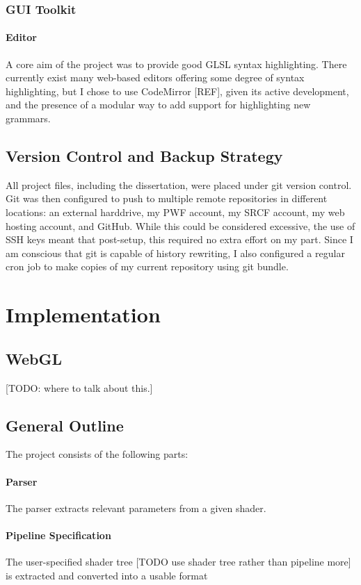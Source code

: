 \documentclass[12pt,twoside,notitlepage]{report}
\begin{document}
\subsection{GUI Toolkit}
\subsubsection{Editor}
A core aim of the project was to provide good GLSL syntax highlighting. There currently exist many web-based editors offering some degree of syntax highlighting, but I chose to use CodeMirror [REF], given its active development, and the presence of a modular way to add support for highlighting new grammars. 

\section{Version Control and Backup Strategy}
All project files, including the dissertation, were placed under git version control. Git was then configured to push to multiple remote repositories in different locations: an external harddrive, my PWF account, my SRCF account, my web hosting account, and GitHub. While this could be considered excessive, the use of SSH keys meant that post-setup, this required no extra effort on my part. Since I am conscious that git is capable of history rewriting, I also configured a regular cron job to make copies of my current repository using git bundle.

\cleardoublepage
\chapter{Implementation}

\section{WebGL}
[TODO: where to talk about this.]

\section{General Outline}
The project consists of the following parts:
\subsubsection{Parser}
The parser extracts relevant parameters from a given shader.
\subsubsection{Pipeline Specification}
The user-specified shader tree [TODO use shader tree rather than pipeline more] is extracted and converted into a usable format
\end{document}
